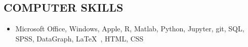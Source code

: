 \documentclass[line,margin,10pt]{res}
\begin{document}
\begin{resume}
  

\section{COMPUTER SKILLS} 
 \begin{itemize}[leftmargin=-2pt] \itemsep -2pt
\item [] Microsoft Office, Windows, Apple, R, Matlab, Python, Jupyter, git, SQL, SPSS, DataGraph, \LaTeX\ , HTML, CSS
 \end{itemize}


\end{resume}
\end{document}
